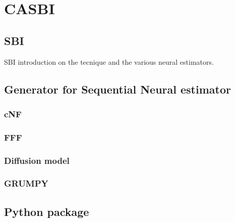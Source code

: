 \chapter{CASBI}

\section{SBI}
SBI introduction on the tecnique and the various neural estimators. 

\section{Generator for Sequential Neural estimator}
\subsection{cNF}
\subsection{FFF}
\subsection{Diffusion model}
\subsection{GRUMPY}

\section{Python package}